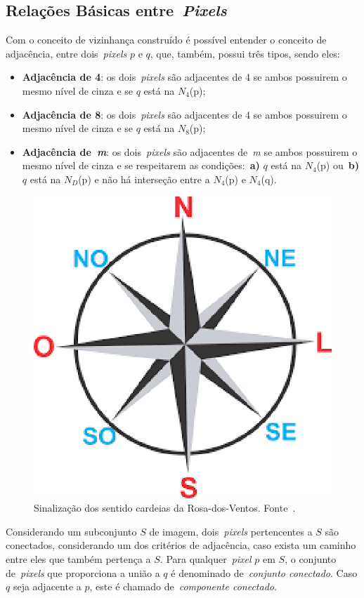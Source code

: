 \documentclass[conference]{Trabalho_1}
\begin{document}
\subsection{Rela\c{c}\~oes B\'asicas entre~\textit{Pixels}}
Com o conceito de vizinhan\c{c}a constru\'ido \'e poss\'ivel entender o conceito de adjac\^encia, entre dois~\textit{pixels} $p$ e $q$, que, tamb\'em, possui tr\^es tipos, sendo eles:

\begin{itemize}
 \item \textbf{Adjac\^encia de 4}: os dois~\textit{pixels} s\~ao adjacentes de 4 se ambos possuirem o mesmo n\'ivel de cinza e se $q$ est\'a na $N_4$(p);
 \item \textbf{Adjac\^encia de 8}: os dois~\textit{pixels} s\~ao adjacentes de 4 se ambos possuirem o mesmo n\'ivel de cinza e se $q$ est\'a na $N_8$(p);
 \item \textbf{Adjac\^encia de~\textit{m}}: os dois~\textit{pixels} s\~ao adjacentes de~\textit{m} se ambos possuirem o mesmo n\'ivel de cinza e se respeitarem as condi\c{c}\~oes:~\textbf{a)} $q$ est\'a na $N_4$(p) ou~\textbf{b)} $q$ est\'a na $N_D$(p) e n\~ao h\'a interse\c{c}\~ao entre a $N_4$(p) e $N_4$(q). 
\end{itemize}

\begin{figure}[!t]
  \centering
  \includegraphics[width = 4.5 cm]{rosadosventos}
  \caption{Sinaliza\c{c}\~ao dos sentido cardeias da Rosa-dos-Ventos. Fonte~\cite{rosadosventos}.}
  \label{fig:rosadosventos}
\end{figure}

Considerando um subconjunto $S$ de imagem, dois~\textit{pixels} pertencentes a $S$ s\~ao conectados, considerando um dos crit\'erios de adjac\^encia, caso exista um caminho entre eles que tamb\'em perten\c{c}a a $S$. Para qualquer~\textit{pixel} $p$ em $S$, o conjunto de~\textit{pixels} que proporciona a uni\~ao a $q$ \'e denominado de~\textit{conjunto conectado}. Caso $q$ seja adjacente a $p$, este \'e chamado de~\textit{componente conectado}.
\end{document}
